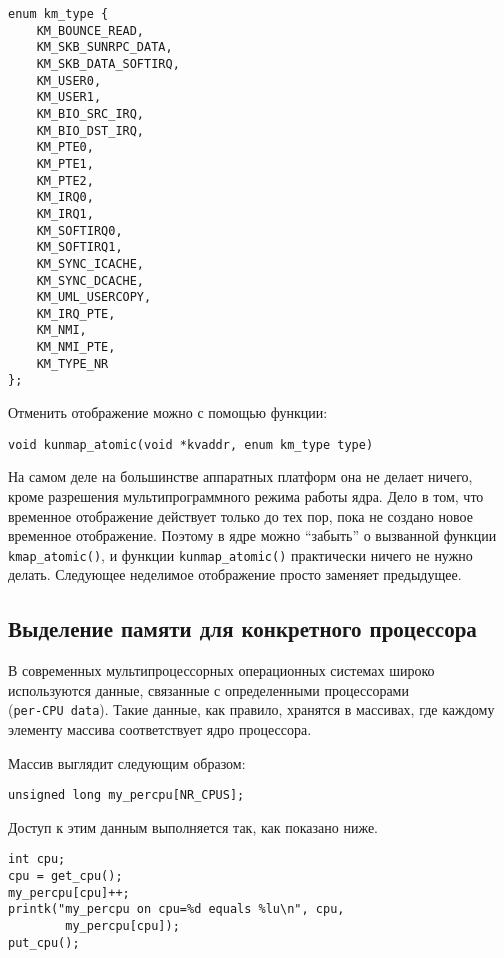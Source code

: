 \documentclass[12pt]{article}
\begin{document}
\begin{lstlisting}
enum km_type {
    KM_BOUNCE_READ,
    KM_SKB_SUNRPC_DATA,
    KM_SKB_DATA_SOFTIRQ,
    KM_USER0,
    KM_USER1,
    KM_BIO_SRC_IRQ,
    KM_BIO_DST_IRQ,
    KM_PTE0,
    KM_PTE1,
    KM_PTE2,
    KM_IRQ0,
    KM_IRQ1,
    KM_SOFTIRQ0,
    KM_SOFTIRQ1,
    KM_SYNC_ICACHE,
    KM_SYNC_DCACHE,
    KM_UML_USERCOPY,
    KM_IRQ_PTE,
    KM_NMI,
    KM_NMI_PTE,
    KM_TYPE_NR
};
\end{lstlisting}

Отменить отображение можно с помощью функции:

\begin{lstlisting}
void kunmap_atomic(void *kvaddr, enum km_type type)
\end{lstlisting}

На самом деле на большинстве аппаратных платформ она не делает ничего,
кроме разрешения мультипрограммного режима работы ядра.
Дело в том, что временное отображение действует только до тех пор, пока не создано новое временное отображение.
Поэтому в ядре можно “забыть” о вызванной функции \verb!kmap_atomic()!, и функции \verb!kunmap_atomic()! практически ничего не нужно делать.
Следующее неделимое отображение просто заменяет предыдущее.

\pagebreak
\subsection*{Выделение памяти для конкретного процессора}

В современных мультипроцессорных операционных системах широко \\
используются данные, связанные с определенными процессорами \\ (\verb!per-CPU data!).
Такие данные, как правило, хранятся в массивах, где каждому элементу массива соответствует ядро процессора.

Массив выглядит следующим образом:

\begin{lstlisting}
unsigned long my_percpu[NR_CPUS];
\end{lstlisting}

Доступ к этим данным выполняется так, как показано ниже.

\begin{lstlisting}
int cpu;
cpu = get_cpu();
my_percpu[cpu]++;
printk("my_percpu on cpu=%d equals %lu\n", cpu,
        my_percpu[cpu]);
put_cpu();
\end{lstlisting}
\end{document}
